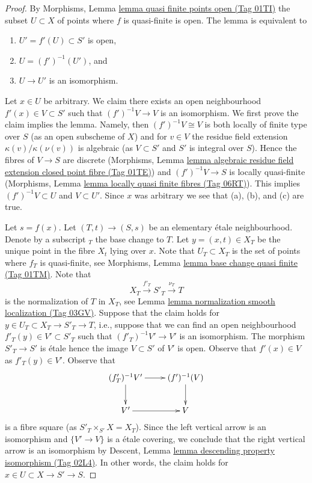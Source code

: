 \documentclass{amsart}
\theoremstyle{plain}
\theoremstyle{definition}
\theoremstyle{remark}
\numberwithin{equation}{subsection}
\begin{document}
\begin{proof}
By Morphisms, Lemma \href{https://stacks.math.columbia.edu/tag/01TI}{lemma quasi finite points open (Tag 01TI)}
the subset $U \subset X$ of points where $f$ is quasi-finite is open.
The lemma is equivalent to
\begin{enumerate}
\item[(a)] $U' = f'(U) \subset S'$ is open,
\item[(b)] $U = (f')^{-1}(U')$, and
\item[(c)] $U \to U'$ is an isomorphism.
\end{enumerate}
Let $x \in U$ be arbitrary. We claim there exists an open
neighbourhood $f'(x) \in V \subset S'$ such that $(f')^{-1}V \to V$ is an
isomorphism. We first prove the claim implies the lemma.
Namely, then $(f')^{-1}V \cong V$ is both locally of finite
type over $S$ (as an open subscheme of $X$) and for $v \in V$ the residue
field extension $\kappa(v)/\kappa(\nu(v))$ is algebraic (as
$V \subset S'$ and $S'$ is integral over $S$). Hence the fibres
of $V \to S$ are discrete (Morphisms, Lemma
\href{https://stacks.math.columbia.edu/tag/01TE}{lemma algebraic residue field extension closed point fibre (Tag 01TE)})
and $(f')^{-1}V \to S$ is locally quasi-finite
(Morphisms, Lemma \href{https://stacks.math.columbia.edu/tag/06RT}{lemma locally quasi finite fibres (Tag 06RT)}).
This implies $(f')^{-1}V \subset U$ and $V \subset U'$. Since $x$ was
arbitrary we see that (a), (b), and (c) are true.

\medskip\noindent
Let $s = f(x)$. Let $(T, t) \to (S, s)$ be an elementary \'etale
neighbourhood. Denote by a subscript ${}_T$ the base change to $T$.
Let $y = (x, t) \in X_T$ be the unique point in
the fibre $X_t$ lying over $x$. Note that $U_T \subset X_T$
is the set of points where $f_T$ is quasi-finite, see
Morphisms, Lemma \href{https://stacks.math.columbia.edu/tag/01TM}{lemma base change quasi finite (Tag 01TM)}.
Note that
$$
X_T \xrightarrow{f'_T} S'_T \xrightarrow{\nu_T} T
$$
is the normalization of $T$ in $X_T$, see
Lemma \href{https://stacks.math.columbia.edu/tag/03GV}{lemma normalization smooth localization (Tag 03GV)}.
Suppose that the claim holds for $y \in U_T \subset X_T \to S'_T \to T$, i.e.,
suppose that we can find an open neighbourhood
$f'_T(y) \in V' \subset S'_T$ such that $(f'_T)^{-1}V' \to V'$ is an
isomorphism. The morphism $S'_T \to S'$ is \'etale hence the image
$V \subset S'$ of $V'$ is open. Observe that $f'(x) \in V$ as $f'_T(y) \in V'$.
Observe that
$$
\xymatrix{
(f'_T)^{-1}V' \ar[r] \ar[d] & (f')^{-1}(V) \ar[d] \\
V' \ar[r] & V
}
$$
is a fibre square (as $S'_T \times_{S'} X = X_T$).
Since the left vertical arrow is an isomorphism
and $\{V' \to V\}$ is a \'etale covering, we conclude that the right vertical
arrow is an isomorphism by
Descent, Lemma \href{https://stacks.math.columbia.edu/tag/02L4}{lemma descending property isomorphism (Tag 02L4)}.
In other words, the claim holds for $x \in U \subset X \to S' \to S$.


\end{proof}
\end{document}
